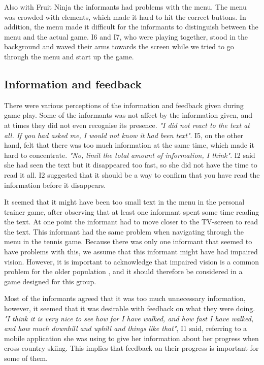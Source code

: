 Also with Fruit Ninja the informants had problems with the menu. The menu was crowded with elements, which made it hard to hit the correct buttons. In addition, the menu made it difficult for the informants to distinguish between the menu and the actual game. I6 and I7, who were playing together, stood in the background and waved their arms towards the screen while we tried to go through the menu and start up the game. 

\subsection{Information and feedback}
There were various perceptions of the information and feedback given during game play. Some of the informants was not affect by the information given, and at times they did not even recognise its presence. \emph{"I did not react to the text at all. If you had asked me, I would not know it had been text"}. I5, on the other hand, felt that there was too much information at the same time, which made it hard to concentrate. \emph{"No, limit the total amount of information, I think"}.  I2 said she had seen the text but it disappeared too fast, so she did not have the time to read it all. I2 suggested that it should be a way to confirm that you have read the information before it disappears. 

It seemed that it might have been too small text in the menu in the personal trainer game, after observing that at least one informant spent some time reading the text. At one point the informant had to move closer to the TV-screen to read the text. This informant had the same problem when navigating through the menu in the tennis game. Because there was only one informant that seemed to have problems with this, we assume that this informant might have had impaired vision. However, it is important to acknowledge that impaired vision is a common problem for the older population \cite{ijsselsteijn2007digital}, and it should therefore be considered in a game designed for this group. 

Most of the informants agreed that it was too much unnecessary information, however, it seemed that it was desirable with feedback on what they were doing. \emph{"I think it is very nice to see how far I have walked, and how fast I have walked, and how much downhill and uphill and things like that"}, I1 said, referring to a mobile application she was using to give her information about her progress when cross-country skiing. This implies that feedback on their progress is important for some of them.  

